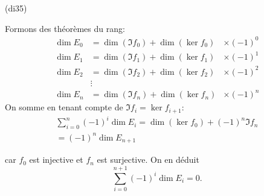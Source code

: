 \begin{tiny}(di35)\end{tiny} Formons des théorèmes du rang: 
\begin{align*}
\dim E_0 &= \dim (\Im f_0) + \dim (\ker f_0) &\times (-1)^0 \\  
\dim E_1 &= \dim (\Im f_1) + \dim (\ker f_1) &\times (-1)^1 \\
\dim E_2 &= \dim (\Im f_2) + \dim (\ker f_2) &\times (-1)^2  \\
 & \vdots \\
 \dim E_n &= \dim (\Im f_n) + \dim (\ker f_n) &\times (-1)^n
\end{align*}
On somme en tenant compte de $\Im f_i = \ker f_{i+1}$:
\begin{multline*}
  \sum_{i=0}^n (-1)^{i}\dim E_i = \dim (\ker f_0) + (-1)^n\Im f_{n}\\
  = (-1)^n \dim E_{n+1}
\end{multline*}

car $f_0$ est injective et $f_n$ est surjective. On en déduit
\[
  \sum_{i=0}^{n+1} (-1)^{i}\dim E_i = 0.
\]
